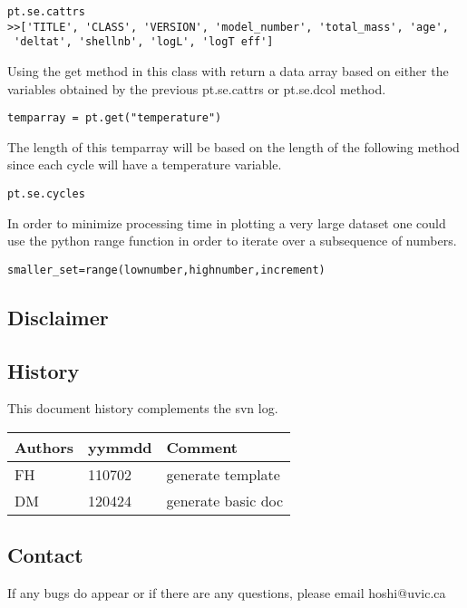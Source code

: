 \begin{verbatim}
pt.se.cattrs
>>['TITLE', 'CLASS', 'VERSION', 'model_number', 'total_mass', 'age',
 'deltat', 'shellnb', 'logL', 'logT eff']
\end{verbatim}


Using the get method in this class with return a data array based on either the variables obtained
by the previous pt.se.cattrs or pt.se.dcol method.

\begin{verbatim}
temparray = pt.get("temperature")
\end{verbatim}

The length of this temparray will be based on the length of the following method
since each cycle will have a temperature variable.

\begin{verbatim}
pt.se.cycles
\end{verbatim}

In order to minimize processing time in plotting a very large dataset one could use the python range function in order to iterate over a subsequence of numbers.


\begin{verbatim}
smaller_set=range(lownumber,highnumber,increment)
\end{verbatim}







\subsection{Disclaimer}

		
\subsection{History} 
This document history complements the svn log.

\begin{tabular*}{\textwidth}{lll}
\hline
Authors & yymmdd & Comment \\
\hline
FH & 110702 & generate template \\
\hline
DM & 120424 & generate basic doc \\
\hline
\end{tabular*}


\subsection{Contact}
If any bugs do appear or if there are any questions, please email hoshi@uvic.ca
\begin{verbatim}

\end{verbatim}


